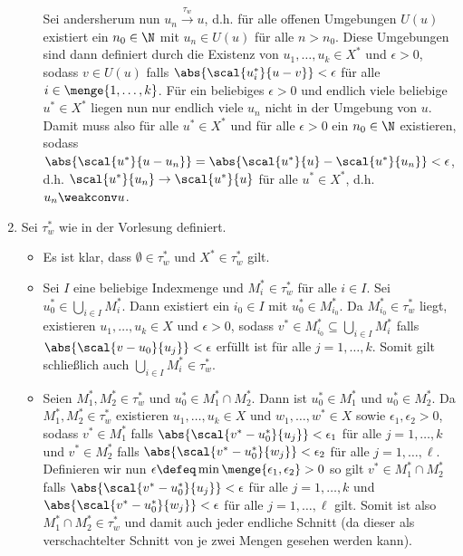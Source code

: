 \begin{exercisePage}
\begin{enumerate}[label=(zu \alph*), leftmargin=*]
\begin{itemize}
			Sei andersherum nun $u_n \overset{\tau_w}{\to} u$, d.h. für alle offenen Umgebungen $U(u)$ existiert ein $n_0 \in \N$ mit $u_n \in U(u)$ für alle $n>n_0$. Diese Umgebungen sind dann definiert durch die Existenz von $u_1, \dots, u_k \in X^\ast$ und $\epsilon > 0$, sodass $v \in U(u)$ falls $\abs{\scal{u_i^\ast}{u-v}} < \epsilon$ für alle $i \in \menge{1,  \dots, k}$. Für ein beliebiges $\epsilon>0$ und endlich viele beliebige $u^\ast \in X^\ast$ liegen nun nur endlich viele $u_n$ nicht in der Umgebung von $u$. Damit muss also für alle $u^\ast \in X^\ast$ und für alle $\epsilon >0$ ein $n_0 \in \N$ existieren, sodass $\abs{\scal{u^\ast}{u-u_n}} = \abs{\scal{u^\ast}{u} - \scal{u^\ast}{u_n}}	< \epsilon$, d.h. $\scal{u^\ast}{u_n} \to \scal{u^\ast}{u}$ für alle $u^\ast \in X^\ast$, d.h. $u_n \weakconv u$.
		\end{itemize}
	\pagebreak
		\item Sei $\tau_w^\ast$ wie in der Vorlesung definiert.
		\begin{itemize}
			\item Es ist klar, dass $\emptyset \in \tau_w^\ast$ und $X^\ast \in \tau_w^\ast$ gilt.
			\item Sei $I$ eine beliebige Indexmenge und $M_i^\ast \in \tau_w^\ast$ für alle $i \in I$. Sei $u_0^\ast \in \bigcup_{i \in I} M_i^\ast$. Dann existiert ein $i_0 \in I$ mit $u_0^\ast \in M_{i_0}^\ast$. Da $M_{i_0}^\ast \in \tau_w^\ast$ liegt, existieren $u_1, \dots, u_k \in X$ und $\epsilon > 0$, sodass $v^\ast \in M_{i_0}^\ast \subseteq \bigcup_{i \in I} M_i^\ast$ falls $\abs{\scal{v-u_0}{u_j}} < \epsilon$ erfüllt ist für alle $j = 1, \dots, k$. Somit gilt schließlich auch $\bigcup_{i \in I} M_i^\ast \in \tau_w^\ast$.
			\item Seien $M_1^\ast, M_2^\ast \in \tau_w^\ast$ und $u_0^\ast \in M_1^\ast \cap M_2^\ast$. Dann ist $u_0^\ast \in M_1^\ast$ und $u_0^\ast \in M_2^\ast$. Da $M_1^\ast, M_2^\ast \in \tau_w^\ast$ existieren $u_1, \dots, u_k \in X$ und $w_1, \dots, w^\ast \in X$ sowie $\epsilon_1, \epsilon_2 > 0$, sodass $v^\ast \in M_1^\ast$ falls $\abs{\scal{v^\ast-u_0^\ast}{u_j}} < \epsilon_1$ für alle $j = 1, \dots, k$ und $v^\ast \in M_2^\ast$ falls $\abs{\scal{v^\ast-u_0^\ast}{w_j}} < \epsilon_2$ für alle $j = 1, \dots, \ell$. Definieren wir nun $\epsilon \defeq \min\menge{\epsilon_1, \epsilon_2} > 0$ so gilt $v^\ast \in M_1^\ast \cap M_2^\ast$ falls $\abs{\scal{v^\ast-u_0^\ast}{u_j}} < \epsilon$ für alle $j = 1, \dots, k$ und $\abs{\scal{v^\ast-u_0^\ast}{w_j}} < \epsilon$ für alle $j = 1, \dots, \ell$ gilt. Somit ist also $M_1^\ast \cap M_2^\ast \in \tau_w^\ast$ und damit auch jeder endliche Schnitt (da dieser als verschachtelter Schnitt von je zwei Mengen gesehen werden kann).			

\end{itemize}
\end{enumerate}
\end{exercisePage}
